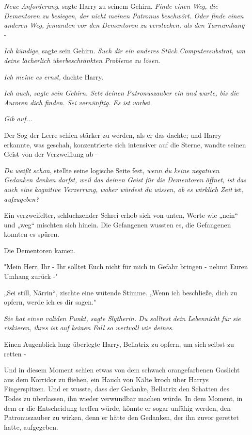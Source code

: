 {\emph{Neue Anforderung}, sagte Harry zu seinem Gehirn. \emph{Finde einen Weg, die Dementoren zu besiegen, der nicht meinen Patronus beschwört. Oder finde einen anderen Weg, jemanden vor den Dementoren zu verstecken, als den Tarnumhang} -

\emph{Ich kündige}, sagte sein Gehirn. \emph{Such dir ein anderes Stück Computersubstrat, um deine lächerlich überbeschränkten Probleme zu lösen.}

\emph{Ich meine es ernst,} dachte Harry.

\emph{\emph{Ich auch}, sagte sein Gehirn. \emph{Setz deinen} \emph{Patronuszauber} \emph{ein und warte, bis die Auroren dich finden. Sei vernünftig. Es ist vorbei.}}

\emph{\emph{Gib auf...}}

Der Sog der Leere schien stärker zu werden, als er das dachte; und Harry erkannte, was geschah, konzentrierte sich intensiver auf die Sterne, wandte seinen Geist von der Verzweiflung ab -

\emph{Du weißt schon}, stellte seine logische Seite fest, \emph{wenn du keine negativen Gedanken denken darfst, weil das deinen Geist für die Dementoren öffnet, ist das auch eine kognitive Verzerrung, woher würdest du wissen, ob es wirklich Zeit} ist\emph{, aufzugeben?}

Ein verzweifelter, schluchzender Schrei erhob sich von unten, Worte wie „nein“ und „weg“ mischten sich hinein. Die Gefangenen wussten es, die Gefangenen konnten es spüren.

Die Dementoren kamen.

"Mein Herr, Ihr - Ihr solltet Euch nicht für mich in Gefahr bringen - nehmt Euren Umhang zurück -"

„Sei still, Närrin“, zischte eine wütende Stimme. „Wenn ich beschließe, dich zu opfern, werde ich es dir sagen."

\emph{\emph{Sie hat einen validen Punkt}, sagte Slytherin. \emph{Du solltest} \emph{dein Leben}nicht \emph{für sie riskieren, ihres} \emph{ist auf keinen Fall so wertvoll wie deines.}}

Einen Augenblick lang überlegte Harry, Bellatrix zu opfern, um sich selbst zu retten -

Und in diesem Moment schien etwas von dem schwach orangefarbenen Gaslicht aus dem Korridor zu fliehen, ein Hauch von Kälte kroch über Harrys Fingerspitzen. Und er wusste, dass der Gedanke, Bellatrix den Schatten des Todes zu überlassen, ihn wieder verwundbar machen würde. In dem Moment, in dem er die Entscheidung treffen würde, könnte er sogar unfähig werden, den Patronuszauber zu wirken, denn er hätte den Gedanken, der ihn zuvor gerettet hatte, aufgegeben.

}
